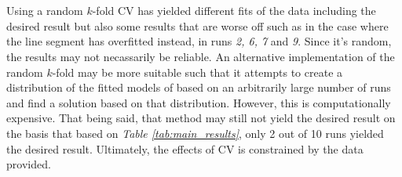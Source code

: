 \documentclass[a4paper,11pt]{article}
\begin{document}
\\ \\
Using a random $k$-fold CV has yielded different fits of the data including the
desired result but also some results that are worse off such as in the case where
the  line segment has overfitted instead, in runs \textit{2, 6, 7} and \textit{9}.
Since it's random, the results may not necassarily be reliable. An alternative
implementation of the random $k$-fold may be more suitable such that it attempts to
create a distribution of the fitted models of based on an arbitrarily large number
of runs and find a solution based on that distribution. However, this is computationally
expensive.  That being said, that method may still not yield the desired result on the
basis that based on \textit{Table \ref{tab:main_results}}, only 2 out of 10 runs yielded
the desired result. Ultimately, the effects of CV is constrained by the data provided.
\end{document}
